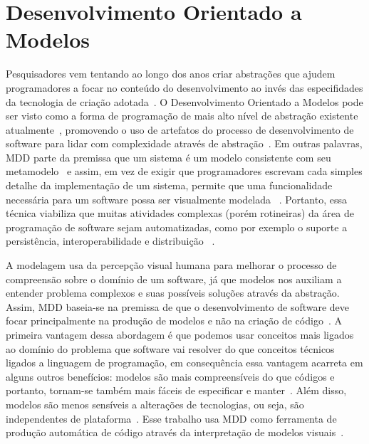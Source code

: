 \section{Desenvolvimento Orientado a Modelos}
\label{referencial-mdd}
Pesquisadores vem tentando ao longo dos anos criar abstrações que ajudem programadores a focar no conteúdo do desenvolvimento ao invés das especifidades da tecnologia de criação adotada~\cite{viyovic2014sirius}. O Desenvolvimento Orientado a Modelos  pode ser visto como a forma de programação de mais alto nível de abstração existente atualmente~\cite{atkinson2003model}, promovendo o uso de artefatos do processo de desenvolvimento de software para lidar com complexidade através de abstração~\cite{viyovic2014sirius}. Em outras palavras, MDD parte da premissa que um sistema é um modelo consistente com seu metamodelo~\cite{vujovic2014comparative} e assim, em vez de exigir que programadores escrevam cada simples detalhe da implementação de um sistema, permite que uma funcionalidade necessária para um software possa ser visualmente modelada ~\cite{atkinson2003model}. Portanto, essa técnica viabiliza que muitas atividades complexas (porém rotineiras) da área de programação de software sejam automatizadas, como por exemplo o suporte a persistência, interoperabilidade e distribuição ~\cite{atkinson2003model}.

A modelagem usa da percepção visual humana para melhorar o processo de compreensão sobre o domínio de um software, já que modelos nos auxiliam a entender problema complexos e suas possíveis soluções através da abstração. Assim, MDD baseia-se na premissa de que o desenvolvimento de software deve focar principalmente na produção de modelos e não na criação de código~\cite{selic2003pragmatics}. A primeira vantagem dessa abordagem é que podemos usar conceitos mais ligados ao domínio do problema que software vai resolver do que conceitos técnicos ligados a linguagem de programação, em consequência essa vantagem acarreta em alguns outros benefícios: modelos são mais compreensíveis do que códigos e portanto, tornam-se também mais fáceis de especificar e manter~\cite{selic2003pragmatics}. Além disso, modelos são menos sensíveis a alterações de tecnologias, ou seja, são independentes de plataforma~\cite{selic2003pragmatics}. Esse trabalho usa MDD como ferramenta de produção automática de código através da interpretação de modelos visuais~\cite{selic2003pragmatics, viyovic2014sirius}.

